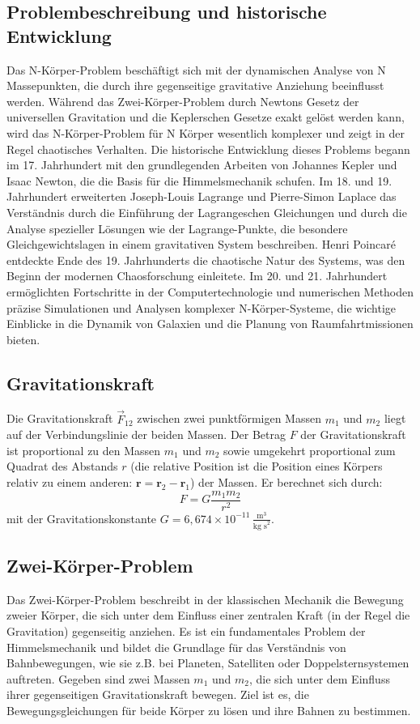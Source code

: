 \documentclass[a4paper,12pt,twoside]{article}
\begin{document}
\subsection{Problembeschreibung und historische Entwicklung}
Das N-Körper-Problem beschäftigt sich mit der dynamischen Analyse von N Massepunkten, die durch ihre gegenseitige gravitative Anziehung beeinflusst werden. Während das Zwei-Körper-Problem durch Newtons Gesetz der universellen Gravitation und die Keplerschen Gesetze exakt gelöst werden kann, wird das N-Körper-Problem für N Körper wesentlich komplexer und zeigt in der Regel chaotisches Verhalten. Die historische Entwicklung dieses Problems begann im 17. Jahrhundert mit den grundlegenden Arbeiten von Johannes Kepler und Isaac Newton, die die Basis für die Himmelsmechanik schufen. Im 18. und 19. Jahrhundert erweiterten Joseph-Louis Lagrange und Pierre-Simon Laplace das Verständnis durch die Einführung der Lagrangeschen Gleichungen und durch die Analyse spezieller Lösungen wie der Lagrange-Punkte, die besondere Gleichgewichtslagen in einem gravitativen System beschreiben. Henri Poincaré entdeckte Ende des 19. Jahrhunderts die chaotische Natur des Systems, was den Beginn der modernen Chaosforschung einleitete. Im 20. und 21. Jahrhundert ermöglichten Fortschritte in der Computertechnologie und numerischen Methoden präzise Simulationen und Analysen komplexer N-Körper-Systeme, die wichtige Einblicke in die Dynamik von Galaxien und die Planung von Raumfahrtmissionen bieten.

\subsection{Gravitationskraft}
Die Gravitationskraft $\vec{F}_{12}$ zwischen zwei punktförmigen Massen $m_1$ und $m_2$ liegt auf der Verbindungslinie der beiden Massen. Der Betrag $F$ der Gravitationskraft ist proportional zu den Massen $m_1$ und $m_2$ sowie umgekehrt proportional zum Quadrat des Abstands $r$ (die relative Position ist die Position eines Körpers relativ zu einem anderen: \(\mathbf{r} = \mathbf{r}_2 - \mathbf{r}_1\)) der Massen. Er berechnet sich durch:
\[
F = G \frac{m_1 m_2}{r^2}
\]
mit der Gravitationskonstante $G = 6{,}674 \times 10^{-11} \, \frac{\text{m}^3}{\text{kg s}^2}$.

\subsection{Zwei-Körper-Problem}

Das Zwei-Körper-Problem beschreibt in der klassischen Mechanik die Bewegung zweier Körper, die sich unter dem Einfluss einer zentralen Kraft (in der Regel die Gravitation) gegenseitig anziehen. Es ist ein fundamentales Problem der Himmelsmechanik und bildet die Grundlage für das Verständnis von Bahnbewegungen, wie sie z.B. bei Planeten, Satelliten oder Doppelsternsystemen auftreten.
Gegeben sind zwei Massen \( m_1 \) und \( m_2 \), die sich unter dem Einfluss ihrer gegenseitigen Gravitationskraft bewegen.
Ziel ist es, die Bewegungsgleichungen für beide Körper zu lösen und ihre Bahnen zu bestimmen.
\end{document}

